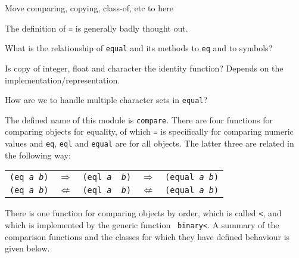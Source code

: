 \label{compare}
\begin{optPrivate}
Move comparing, copying, class-of, etc to here

The definition of {\tt =} is generally badly thought out.

What is the relationship of {\tt equal} and its methods to {\tt eq}
and to symbols?

Is copy of integer, float and character the identity function?
Depends on the implementation/representation.

How are we to handle multiple character sets in {\tt equal}?
\end{optPrivate}
\begin{optDefinition}
The defined name of this module is {\tt compare}.
There are four functions for comparing objects for equality, of which
{\tt =} is specifically for comparing numeric values and {\tt eq},
{\tt eql} and {\tt equal} are for all objects.  The latter three are
related in the following way:

\begin{center}
\begin{tabular}{rcccl}
{\tt (eq {\em a} {\em b})} & $\Rightarrow$ & {\tt (eql {\em a} {\em
b})} & $\Rightarrow$ & {\tt (equal {\em a} {\em b})}\\
{\tt (eq {\em a} {\em b})} & $\not\Leftarrow$ & {\tt (eql {\em a} {\em
b})} & $\not\Leftarrow$ & {\tt (equal {\em a} {\em b})}\\
\end{tabular}
\end{center}

There is one function for comparing objects by order, which is called
{\tt <}, and which is implemented by the generic function {\tt
binary<}.  A summary of the comparison functions and the classes for
which they have defined behaviour is given below.


\end{optDefinition}
